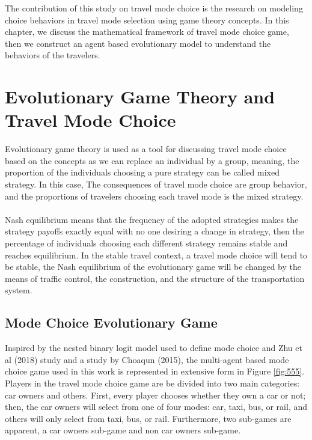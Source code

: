 
The contribution of this study on travel mode choice is the research on modeling choice behaviors in travel mode selection using game theory concepts. In this chapter, we discuss the mathematical framework of travel mode choice game, then we construct an agent based evolutionary model to understand the behaviors of the travelers.
\clearpage

\section{Evolutionary Game Theory and Travel Mode Choice}
Evolutionary game theory is used as a tool for discussing travel mode choice based on the concepts as we can replace an individual by a group, meaning, the proportion of the individuals choosing a pure strategy can be called mixed strategy. In this case, The consequences of travel mode choice are group behavior, and the proportions of travelers choosing each travel mode is the mixed strategy.

\paragraph{}Nash equilibrium means that the frequency of the adopted strategies makes the strategy payoffs exactly equal with no one desiring a change in strategy, then the percentage of individuals choosing each different strategy remains stable and reaches equilibrium. In the stable travel context, a travel mode choice will tend to be stable, the Nash equilibrium of the evolutionary game will be changed by the means of traffic control, the construction, and the structure of the transportation system.

\subsection{Mode Choice Evolutionary Game}

Inspired by the nested binary logit model used to define mode choice and Zhu et al (2018) study and a study by Choaqun (2015), the multi-agent based mode choice game used in this work is represented in extensive form in Figure \ref{fig:555}.
Players in the travel mode choice game are be divided into two main categories: car owners and others. First, every player chooses whether they own a car or not; then, the car owners will select from one of four modes: car, taxi, bus, or rail, and others will only select from taxi, bus, or rail. Furthermore, two sub-games are apparent, a car owners sub-game and non car owners sub-game.

